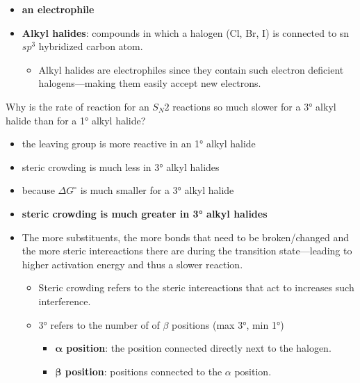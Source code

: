 \documentclass[12pt,a4paper]{article}
\begin{document}
\begin{enumerate}
{\begin{itemize}
        \item {\color{o-Sun}\textbf{an electrophile}}
    \end{itemize}
    }
    \begin{itemize}
        \item \textbf{Alkyl halides}: compounds in which a halogen (Cl, Br, I) is connected to sn \(sp^3\) hybridized carbon atom.
        \begin{itemize}
            \item Alkyl halides are electrophiles since they contain such electron deficient halogens---making them easily accept new electrons.
        \end{itemize}
    \end{itemize}
    {\color{G-Moon}\item Why is the rate of reaction for an \(S_N2\) reactions so much slower for a \ang{3} alkyl halide than for a \ang{1} alkyl halide?
    \begin{itemize}
        \item the leaving group is more reactive in an \ang{1} alkyl halide
        \item steric crowding is much less in \ang{3} alkyl halides
        \item because \(\Delta G^\circ\) is much smaller for a \ang{3} alkyl halide
        \item {\color{o-Sun}\textbf{steric crowding is much greater in \ang{3} alkyl halides}}
    \end{itemize}
    }
    \begin{itemize}
        \item The more substituents, the more bonds that need to be broken/changed and the more steric intereactions there are during the transition state---leading to higher activation energy and thus a slower reaction.
            \begin{itemize}
                \item Steric crowding refers to the steric intereactions that act to increases such interference.
                \item \ang{3} refers to the number of of $\beta$ positions (max \ang{3}, min \ang{1})
                    \begin{itemize}
                        \item \textbf{$\bm{\alpha}$ position}: the position connected directly next to the halogen.
                        \item \textbf{$\bm{\beta}$ position}: positions connected to the $\alpha$ position.

\end{itemize}
\end{itemize}
\end{itemize}
\end{enumerate}
\end{document}
